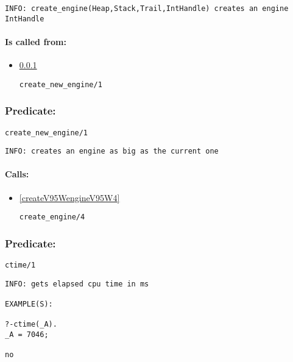 {\small \begin{verbatim}
INFO: create_engine(Heap,Stack,Trail,IntHandle) creates an engine IntHandle

\end{verbatim}}
\paragraph{Is called from:} 
\begin{itemize}
\item \ref{createV95WnewV95WengineV95W1} 
\begin{verbatim}
create_new_engine/1
\end{verbatim}

\end{itemize}

\subsubsection{Predicate:} \label{createV95WnewV95WengineV95W1}

\begin{verbatim}
create_new_engine/1
\end{verbatim}

{\small \begin{verbatim}
INFO: creates an engine as big as the current one

\end{verbatim}}
\paragraph{Calls:} 
\begin{itemize}
\item \ref{createV95WengineV95W4} 
\begin{verbatim}
create_engine/4
\end{verbatim}

\end{itemize}

\subsubsection{Predicate:} \label{ctimeV95W1}

\begin{verbatim}
ctime/1
\end{verbatim}

{\small \begin{verbatim}
INFO: gets elapsed cpu time in ms

EXAMPLE(S):

?-ctime(_A).
_A = 7046;

no

\end{verbatim}}
